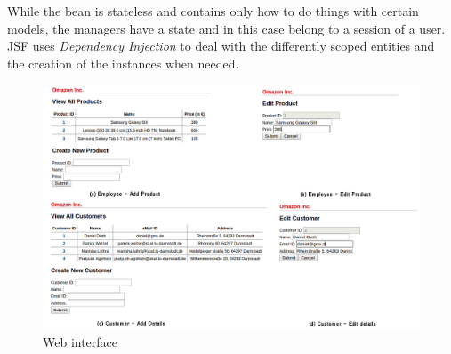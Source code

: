\documentclass[twoside,colorbacktitle,accentcolor=tud1b]{tudexercise}
\begin{document}
While the bean is stateless and contains only how to do things with certain models, the managers have a state and in this case belong to a session of a user.
JSF uses \textit{Dependency Injection} to deal with the differently scoped entities and the creation of the instances when needed.

\begin{figure}[h!]
  \centering
   \includegraphics[width=16cm]{GUI}
   \caption{Web interface}
\end{figure}
\end{document}
